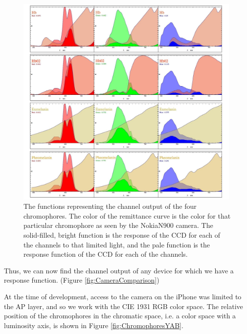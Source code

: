 \begin{figure}[h!]
  \centering
    \includegraphics[width=0.99\textwidth]{Chapter1/Figs/Chromophores_NokiaN900.jpg}
    \caption{The functions representing the channel output of the four chromophores. The color of the remittance curve is the color for that particular chromophore as seen by the NokiaN900 camera. The solid-filled, bright function is the response of the CCD for each of the channels to that limited light, and the pale function is the response function of the CCD for each of the channels.}  \label{fig:Chromophores_NokiaN900}
\end{figure}



Thus, we can now find the channel output of any device for which we have a response function. (Figure \ref{fig:CameraComparison})

At the time of development, access to the camera on the iPhone was limited to the AP layer, and so we work with the CIE 1931 RGB color space. The relative position of the chromophores in the chromatic space, i.e. a color space with a luminosity axis, is shown in Figure \ref{fig:ChromophoresYAB}.








